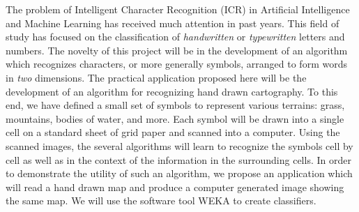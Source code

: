 
The problem of Intelligent Character Recognition (ICR) in Artificial
Intelligence and Machine Learning has received much attention in past years.
This field of study has focused on the classification of \emph{handwritten}  or
\emph{typewritten} letters and numbers.  The novelty of this project will be in
the development of an algorithm which recognizes characters, or more generally
symbols, arranged to form words in \emph{two} dimensions. The practical
application proposed here will be the development of an algorithm for
recognizing hand drawn cartography. To this end, we have defined a small set of
symbols to represent various terrains: grass, mountains, bodies of water, and
more. Each symbol will be drawn into a single cell on a standard sheet of grid
paper and scanned into a computer. Using the scanned images, the several
algorithms will learn to recognize the symbols cell by cell as well as in the
context of the information in the surrounding cells. In order to demonstrate
the utility of such an algorithm, we propose an application which will read a
hand drawn map and produce a computer generated image showing the same map. We
will use the software tool WEKA\cite{hall2009} to create classifiers.

